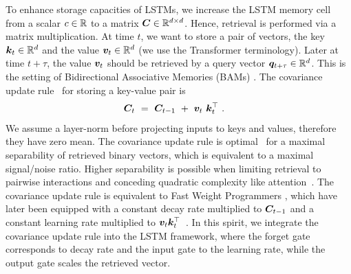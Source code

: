\documentclass[dvipsnames]{article}
\begin{document}
To enhance storage capacities of LSTMs,  
we increase the LSTM memory cell from a scalar $c \in \mathbb{R}$
to a matrix $\bm{C} \in \mathbb{R}^{d \times d}$. 
Hence, retrieval is performed via a matrix multiplication.
At time $t$, we want to store a pair of vectors, 
the key $\bm{k}_t \in \mathbb{R}^d$ and the value $\bm{v}_t \in \mathbb{R}^d$
(we use the Transformer terminology).  
Later at time $t + \tau$, the value $\bm{v}_t$ should be retrieved 
by a query vector $\bm{q}_{t+\tau} \in \mathbb{R}^d$.
This is the setting of Bidirectional Associative Memories (BAMs)
\citep{Kohonen:72,Anderson:72,Nakano:72,Anderson:77}.
The covariance update rule~\citep{Sejnowski:77,Dayan:91} 
for storing a key-value pair is
\begin{align}
\bm{C}_t \ &= \ \bm{C}_{t-1} \ + \ \bm{v}_{t} \ \bm{k}_t^\top \ .
\end{align}
We assume a layer-norm
before projecting inputs
to keys and values, therefore they have zero mean.
The covariance update rule is optimal~\citep{Dayan:91} for a 
maximal separability of retrieved binary vectors, 
which is equivalent to a maximal signal/noise ratio. 
Higher separability is possible when limiting retrieval 
to pairwise interactions and conceding quadratic complexity
like attention~\citep{Krotov:16,Krotov:17,Ramsauer:21}.
The covariance update rule is equivalent to Fast Weight Programmers
\citep{Schmidhuber:92ncfastweights,Schlag:21}, which
have later been equipped with 
a constant decay rate multiplied to $\bm{C}_{t-1}$ and 
a constant learning rate multiplied to 
$\bm{v}_{t} \bm{k}_t ^\top$~\citep{Ba:16}.
In this spirit,
we integrate the covariance update rule into the LSTM framework, where
the forget gate corresponds to decay rate and the input gate to the learning rate,
while the output gate scales the retrieved vector.
\end{document}
